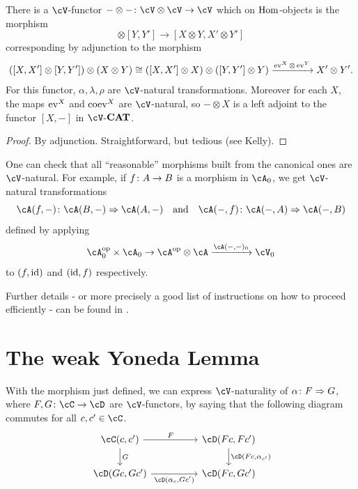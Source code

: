 \documentclass[a4paper,11pt,oneside,openany]{scrbook}
\begin{document}
\begin{prop}
	There is a $ \cV $-functor $ -\otimes -\from \cV \otimes \cV \to \cV $ which
    on $ \operatorname{\text{Hom}} $-objects is the morphism
	\begin{displaymath}
		[X,X']\otimes [Y,Y'] \to [X\otimes Y , X'\otimes Y']
	\end{displaymath}
	corresponding by adjunction to the morphism
	\begin{displaymath}
		([X,X']\otimes[Y,Y']) \otimes (X\otimes Y)\cong ([X,X']\otimes X)\otimes ([Y,Y']\otimes Y) \xrightarrow{\operatorname{ev}^X \otimes \operatorname{ev}^Y} X'\otimes Y'.
	\end{displaymath}
	For this functor, $ \alpha,\lambda,\rho $ are $ \cV $-natural
    transformations. Moreover for each $ X $, the maps $ \operatorname{ev}^X $ and $ \operatorname{coev}^X $
    are $ \cV $-natural, so $ -\otimes X $ is a left adjoint to the functor $
    [X,-] $ in $ \cV $-${\normalfont\textbf{CAT}}$.
\end{prop}
\begin{proof}
	By adjunction. Straightforward, but tedious (see Kelly).
\end{proof}
\begin{rmk}
	One can check that all ``reasonable'' morphisms built from the canonical ones are $ \cV $-natural.
	For example, if $ f \colon A \to B $ is a morphism in $ \cA_0 $, we get $ \cV $-natural transformations
	\begin{displaymath}
		\cA(f,-) \from \cA(B,-)\Rightarrow \cA(A,-) \quad \text{and} \quad  \cA(-,f) \from \cA(-,A) \Rightarrow \cA(-,B)
	\end{displaymath}defined by applying
	\begin{displaymath}
		\cA_0^{\op}\times \cA_0 \to \cA^{\op} \otimes \cA \xrightarrow{\cA(-,-)_0} \cV_0
	\end{displaymath}
	to $ (f,\operatorname{id}) $ and $ (\operatorname{id},f) $ respectively.

	Further details - or more precisely a good list of instructions on how to
    proceed efficiently - can be found in \cite[\S 1.7 and 1.8]{Kelly}.
\end{rmk}


\section{The weak Yoneda Lemma}

\begin{rmk}
	With the morphism just defined, we can express $ \cV $-naturality of $
    \alpha \colon F \Rightarrow G $, where $ F,G\from \cC \to \cD $ are
    $\cV$-functors, by saying that the following diagram commutes for all $ c,c'
    \in \cC $.
	\begin{displaymath}
		\begin{tikzcd}[column sep = huge]
			\cC(c,c') \arrow[r, "F"]\arrow[d, "G"]& \cD(Fc, Fc')\arrow[d, "{\cD(Fc,\alpha_{c'})}"] \\
			\cD(Gc,Gc') \arrow[r, "{\cD(\alpha_c, Gc')}"' ]& \cD(Fc,Gc')
		\end{tikzcd}
	\end{displaymath}
\end{rmk}
\end{document}
